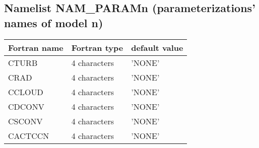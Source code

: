 \subsection{Namelist NAM\_PARAMn (parameterizations' names of model n)}

\begin{center}
\begin{tabular} {|l|l|l|}
\hline
Fortran name & Fortran type & default value \\
\hline
CTURB   &  4 characters  & 'NONE'   \\
CRAD    &  4 characters  & 'NONE'   \\
CCLOUD  &  4 characters  & 'NONE'   \\
CDCONV  &  4 characters  & 'NONE'   \\
CSCONV  &  4 characters  & 'NONE'   \\
CACTCCN &  4 characters  & 'NONE'   \\
\hline
\end{tabular}
\end{center}

